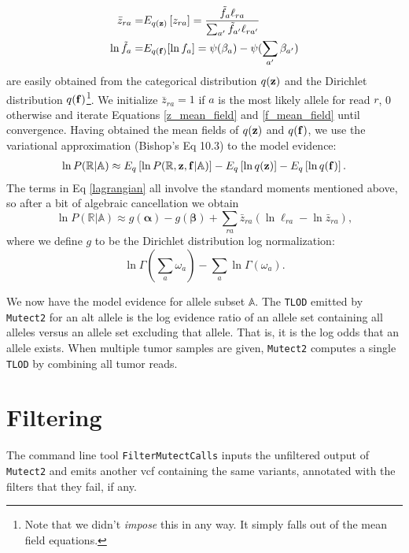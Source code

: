 \documentclass[nofootinbib,amssymb,amsmath]{revtex4}
\newcommand{\vf}{{\bf f}}
\newcommand{\vz}{{\bf z}}
\newcommand{\valpha}{{\bm{\alpha}}}
\newcommand{\vbeta}{{\bm{\beta}}}
\newcommand{\code}[1]{\texttt{#1}}
\begin{document}
\begin{align}
\bar{z}_{ra} =& E_{q(\vz)} \left[ z_{ra} \right] = \frac{\tilde{f}_a \ell_{ra}}{\sum_{a^\prime} \tilde{f}_{a^\prime} \ell_{ra^\prime}} \label{z-bar} \\
\ln \tilde{f}_a =& E_{q(\vf)}[\ln f_a] = \psi(\beta_a) - \psi(\sum_{a^\prime} \beta_{a^\prime})
\label{f-tilde}
\end{align}
are easily obtained from the categorical distribution $q(\vz)$ and the Dirichlet distribution $q(\vf)$\footnote{Note that we didn't \textit{impose} this in any way.  It simply falls out of the mean field equations.}.  We initialize $\bar{z}_{ra} = 1$ if $a$ is the most likely allele for read $r$, 0 otherwise and iterate Equations \ref{z_mean_field} and \ref{f_mean_field} until convergence. Having obtained the mean fields of $q(\vz)$ and $q(\vf)$, we use the variational approximation (Bishop's Eq 10.3) to the model evidence:
\begin{align}
\ln P(\mathbb{R} | \mathbb{A}) \approx  E_q \left[ \ln P(\mathbb{R}, \vz, \vf | \mathbb{A}) \right] - E_q \left[ \ln q(\vz) \right] - E_q \left[ \ln q(\vf) \right]. \label{lagrangian}
\end{align}
The terms in Eq \ref{lagrangian} all involve the standard moments mentioned above, so after a bit of algebraic cancellation we obtain
\begin{equation}
\ln P(\mathbb{R} | \mathbb{A}) \approx g(\valpha) - g(\vbeta) +  \sum_{ra} \bar{z}_{ra} \left( \ln \ell_{ra} - \ln \bar{z}_{ra} \right),
\label{tumor-lod}
\end{equation}
where we define $g$ to be the Dirichlet distribution log normalization:
\begin{equation}
\ln \Gamma(\sum_a \omega_a) - \sum_a \ln \Gamma(\omega_a).
\end{equation}

We now have the model evidence for allele subset $\mathbb{A}$. The \code{TLOD} emitted by \code{Mutect2} for an alt allele is the log evidence ratio of an allele set containing all alleles versus an allele set excluding that allele.  That is, it is the log odds that an allele exists.  When multiple tumor samples are given, \code{Mutect2} computes a single \code{TLOD} by combining all tumor reads.

\section{Filtering}
The command line tool \code{FilterMutectCalls} inputs the unfiltered output of \code{Mutect2} and emits another vcf containing the same variants, annotated with the filters that they fail, if any.
\end{document}
